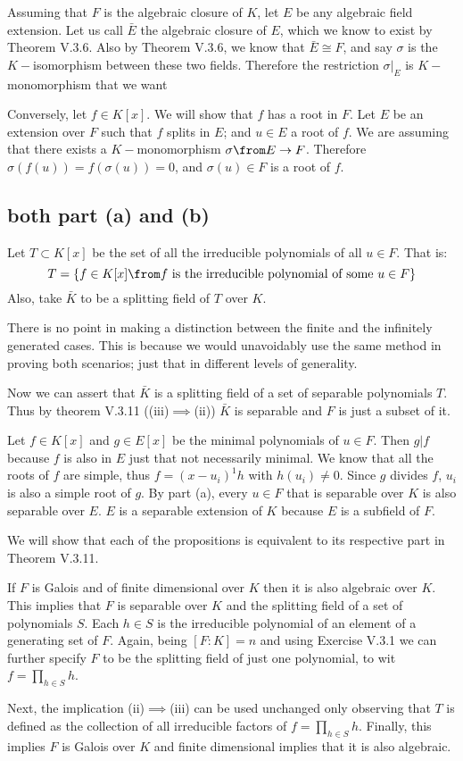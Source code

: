 Assuming that $F$ is the algebraic closure of $K$, let $E$ be any algebraic field extension.
Let us call $\bar E$ the algebraic closure of $E$, which we know to exist by Theorem V.3.6.
Also by  Theorem V.3.6, we know that $\bar E \cong F$, and say $\sigma$ is the $K-$isomorphism between these two fields.
Therefore the restriction $\sigma|_E$ is $K-$monomorphism that we want

Conversely, let $f\in K[x]$. We will show that $f$ has a root in $F$.
Let $E$ be an extension over $F$ such that $f$ splits in $E$; and $u\in E$ a root of $f$.
We are assuming that there exists a $K-$monomorphism $\sigma\from E\to F$.
Therefore $\sigma(f(u))=f(\sigma(u))=0$, and $\sigma(u)\in F$ is a root of $f$. 

\subsection*{both part (a) and (b)}
Let $T\subset K[x]$ be the set of all the irreducible polynomials of all $u\in F$. That is:
$$T=\{ f\in K[x] \from f \text{ is the irreducible polynomial of some } u\in F\}$$
Also, take $\bar K$ to be a splitting field of $T$ over $K$. 

There is no point in making a distinction between the finite and the infinitely generated cases. This is because we would unavoidably use the same method in proving both scenarios; just that in different levels of generality.

Now we can assert that $\bar K$ is a splitting field of a set of separable polynomials $T$.
Thus by theorem V.3.11 ((iii)$\implies $(ii)) $\bar K$ is separable and $F$ is just a subset of it.

Let $f\in K[x]$ and $g\in E[x]$ be the minimal polynomials of $u\in F$. Then $g|f$ because $f$ is also in $E$ just that not necessarily minimal. We know that all the roots of $f$ are simple, thus $f= (x-u_i)^1h$ with $h(u_i)\neq 0$. Since $g$ divides $f$, $u_i$ is also a simple root of $g$.
By part (a), every $u\in F$ that is separable over $K$ is also separable over $E$. 
$E$ is a separable extension of $K$ because $E$ is a subfield of $F$.

We will show that each of the propositions is equivalent to its respective part in  Theorem V.3.11.

If $F$ is Galois and of finite dimensional over $K$ then it is also algebraic over $K$. 
This implies that $F$ is separable over $K$ and  the splitting field of a  set of polynomials $S$. 
Each $h\in S$ is the irreducible polynomial of an element of a generating set of $F$. 
Again, being $[F:K]=n$ and using Exercise V.3.1 we can further specify $F$ to be the splitting field of just one polynomial, to wit $f=\prod_{h\in S}h$.

Next, the implication (ii)$\implies$(iii) can be used unchanged only observing that $T$ is defined as the collection of all irreducible factors of $f=\prod_{h\in S}h$. 
Finally, this implies $F$ is Galois over $K$ and finite dimensional implies that it is also algebraic.


